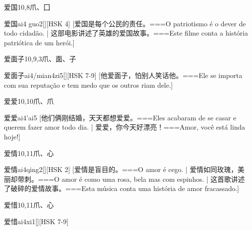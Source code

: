 \begin{Entry}{爱国}{10,8}{⽖、⼞}
  \begin{Phonetics}{爱国}{ai4 guo2}[][HSK 4]
    [爱国是每个公民的责任。===O patriotismo é o dever de todo cidadão. | 这部电影讲述了英雄的爱国故事。===Este filme conta a história patriótica de um herói.]
  \end{Phonetics}
\end{Entry}

\begin{Entry}{爱面子}{10,9,3}{⽖、⾯、⼦}
  \begin{Phonetics}{爱面子}{ai4/mian4zi5}[][HSK 7-9]
    [他爱面子，怕别人笑话他。===Ele se importa com sua reputação e tem medo que os outros riam dele.]
  \end{Phonetics}
\end{Entry}

\begin{Entry}{爱爱}{10,10}{⽖、⽖}
  \begin{Phonetics}{爱爱}{ai4'ai5}
    [他们俩刚结婚，天天都想爱爱。===Eles acabaram de se casar e querem fazer amor todo dia. | 爱爱，你今天好漂亮！===Amor, você está linda hoje!]
  \end{Phonetics}
\end{Entry}

\begin{Entry}{爱情}{10,11}{⽖、⼼}
  \begin{Phonetics}{爱情}{ai4qing2}[][HSK 2]
    [爱情是盲目的。===O amor é cego. | 爱情如同玫瑰，美丽却带刺。===O amor é como uma rosa, bela mas com espinhos.  | 这首歌讲述了破碎的爱情故事。===Esta música conta uma história de amor fracassado.]
  \end{Phonetics}
\end{Entry}

\begin{Entry}{爱惜}{10,11}{⽖、⼼}
  \begin{Phonetics}{爱惜}{ai4xi1}[][HSK 7-9]
  \end{Phonetics}
\end{Entry}

